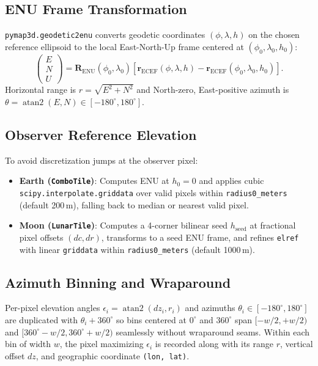 \documentclass[11pt,letterpaper]{article}
\begin{document}
\subsection{ENU Frame Transformation}
\texttt{pymap3d.geodetic2enu} converts geodetic coordinates $(\phi, \lambda, h)$ on the chosen reference ellipsoid to the local East-North-Up frame centered at $(\phi_0, \lambda_0, h_0)$:
\begin{equation}
  \begin{pmatrix} E \\ N \\ U \end{pmatrix}
  = \mathbf{R}_{\mathrm{ENU}}(\phi_0, \lambda_0)
  \left[ \mathbf{r}_{\mathrm{ECEF}}(\phi, \lambda, h) - \mathbf{r}_{\mathrm{ECEF}}(\phi_0, \lambda_0, h_0) \right].
\end{equation}
Horizontal range is $r = \sqrt{E^2 + N^2}$ and North-zero, East-positive azimuth is $\theta = \operatorname{atan2}(E, N) \in [-180^\circ, 180^\circ]$.

\subsection{Observer Reference Elevation}
To avoid discretization jumps at the observer pixel:
\begin{itemize}
  \item \textbf{Earth (\texttt{ComboTile})}: Computes ENU at $h_0=0$ and applies cubic \texttt{scipy.interpolate.griddata} over valid pixels within \texttt{radius0\_meters} (default 200\,m), falling back to median or nearest valid pixel.
  \item \textbf{Moon (\texttt{LunarTile})}: Computes a 4-corner bilinear seed $h_{\mathrm{seed}}$ at fractional pixel offsets $(dc, dr)$, transforms to a seed ENU frame, and refines \texttt{elref} with linear \texttt{griddata} within \texttt{radius0\_meters} (default 1000\,m).
\end{itemize}

\subsection{Azimuth Binning and Wraparound}
Per-pixel elevation angles $\epsilon_i = \operatorname{atan2}(dz_i, r_i)$ and azimuths $\theta_i \in [-180^\circ, 180^\circ]$ are duplicated with $\theta_i + 360^\circ$ so bins centered at $0^\circ$ and $360^\circ$ span $[-w/2, +w/2)$ and $[360^\circ - w/2, 360^\circ + w/2)$ seamlessly without wraparound seams. Within each bin of width $w$, the pixel maximizing $\epsilon_i$ is recorded along with its range $r$, vertical offset $dz$, and geographic coordinate \texttt{(lon, lat)}.
\end{document}
